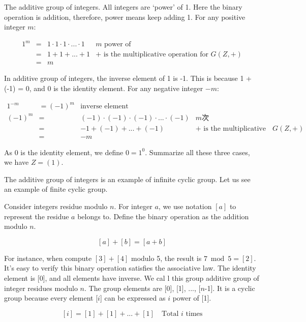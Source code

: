 \documentclass{article}
\begin{document}
\begin{example}
The additive group of integers. All integers are `power' of 1. Here the binary operation is addition, therefore, power means keep adding 1. For any positive integer $m$:

\[
\begin{array}{rcll}
1^m & = & 1 \cdot 1 \cdot 1 \cdot ... \cdot 1 & \text{$m$ power of} \\
    & = & 1 + 1 + ... + 1 & \text{+ is the multiplicative operation for $G(Z, +)$} \\
    & = & m &
\end{array}
\]

In additive group of integers, the inverse element of 1 is -1. This is because 1 + (-1) = 0, and 0 is the identity element. For any negative integer $-m$:

\[
\begin{array}{rcll}
1^{-m} & = (-1)^m & \text{inverse element} & \\
(-1)^m & = & (-1) \cdot (-1) \cdot (-1) \cdot ... \cdot (-1) & \text{$m$次} \\
       & = & -1 + (-1) + ... + (-1) & \text{+ is the multiplicative operation for $G(Z, +)$} \\
       & = & -m &
\end{array}
\]

As 0 is the identity element, we define $0 = 1^0$. Summarize all these three cases, we have $Z = (1)$.
\end{example}

The additive group of integers is an example of infinite cyclic group. Let us see an example of finite cyclic group.

\begin{example}
Consider integers residue modulo $n$. For integer $a$, we use notation $[a]$ to represent the residue $a$ belongs to. Define the binary operation as the addition modulo $n$.

\[
[a] + [b] = [a + b]
\]

For instance, when compute $[3] + [4]$ modulo 5, the result is $7 \bmod 5 = [2]$. It's easy to verify this binary operation satisfies the associative law. The identity element is [0], and all elements have inverse. We cal l this group additive group of integer residues modulo $n$. The group elements are [0], [1], ..., [$n$-1]. It is a cyclic group because every element [$i$] can be expressed as $i$ power of [1].

\[
[i] = [1] + [1] + ... + [1] \quad \text{Total $i$ times}
\]
\end{example}
\end{document}

